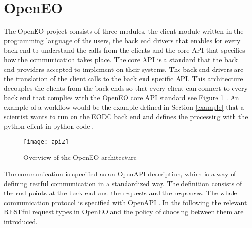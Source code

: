 \documentclass[draft,final]{vutinfth} %
\begin{document}
\section{OpenEO}\label{OpenEO}
The OpenEO project consists of three modules, the client module written in the programming language of the users, the back end drivers that enables for every back end to understand the calls from the clients and the core API that specifies how the communication takes place. The core API is a standard that the back end providers accepted to implement on their systems. The back end drivers are the translation of the client calls to the back end specific API. This architecture decouples the clients from the back ends so that every client can connect to every back end that complies with the OpenEO core API standard see Figure \ref{fig:api2} . An example of a workflow would be the example defined in Section \ref{example} that a scientist wants to run on the EODC back end and defines the processing with the python client in python code \cite{openeo}.  

\begin{figure}[h]
	\centering
	\texttt{[image: api2]}
	\caption{Overview of the OpenEO architecture}
	\label{fig:api2} %
\end{figure}


The communication is specified as an OpenAPI description, which is a way of defining \gls{rest}ful communication in a standardized way. The definition consists of the end points at the back end and the requests and the responses. The whole communication protocol is specified with OpenAPI \cite{openapi}. 
In the following the relevant RESTful request types in OpenEO and the policy of choosing between them are introduced.
\end{document}
